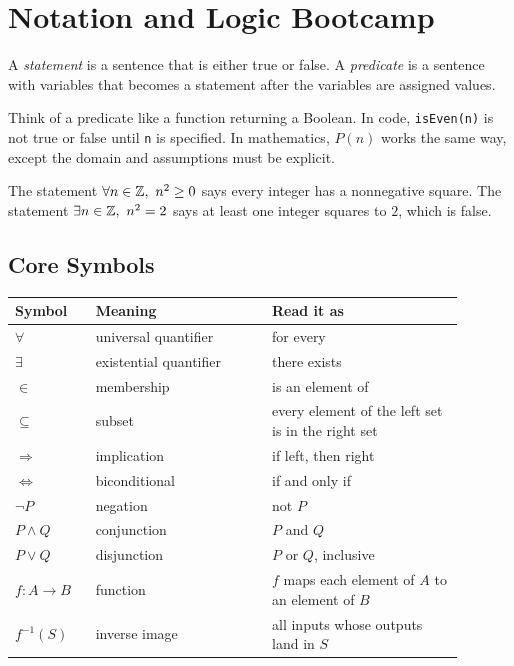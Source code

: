 \documentclass[11pt]{article}
\begin{document}
\section{Notation and Logic Bootcamp}

\begin{definition}
A \emph{statement} is a sentence that is either true or false. A \emph{predicate} is a sentence with variables that becomes a statement after the variables are assigned values.
\end{definition}

\begin{intuitionbox}
Think of a predicate like a function returning a Boolean. In code, \texttt{isEven(n)} is not true or false until \texttt{n} is specified. In mathematics, $P(n)$ works the same way, except the domain and assumptions must be explicit.
\end{intuitionbox}

\begin{formalbox}
The statement $\forall n\in\mathbb{Z},\ n^2\geq 0$ says every integer has a nonnegative square. The statement $\exists n\in\mathbb{Z},\ n^2=2$ says at least one integer squares to $2$, which is false.
\end{formalbox}

\subsection{Core Symbols}

\begin{longtable}{p{0.16\linewidth}p{0.35\linewidth}p{0.38\linewidth}}
\toprule
Symbol & Meaning & Read it as \\
\midrule
$\forall$ & universal quantifier & for every \\
$\exists$ & existential quantifier & there exists \\
$\in$ & membership & is an element of \\
$\subseteq$ & subset & every element of the left set is in the right set \\
$\Rightarrow$ & implication & if left, then right \\
$\Leftrightarrow$ & biconditional & if and only if \\
$\neg P$ & negation & not $P$ \\
$P\land Q$ & conjunction & $P$ and $Q$ \\
$P\lor Q$ & disjunction & $P$ or $Q$, inclusive \\
$f:A\to B$ & function & $f$ maps each element of $A$ to an element of $B$ \\
$f^{-1}(S)$ & inverse image & all inputs whose outputs land in $S$ \\
\bottomrule
\end{longtable}
\end{document}
